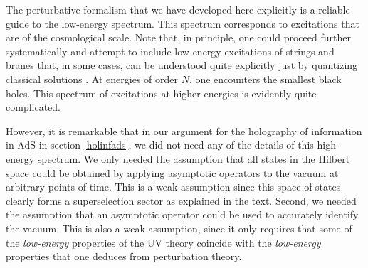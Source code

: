 \documentclass[12pt]{article}
\begin{document}
The perturbative formalism that we have developed here explicitly is a reliable guide to the low-energy spectrum. This spectrum corresponds to excitations that are of the cosmological scale.  Note that, in principle, one could proceed further systematically and attempt to include low-energy excitations of strings and branes that, in some cases, can be understood quite explicitly just by quantizing classical solutions \cite{Grant:2005qc,Mandal:2005wv,Maldacena:2000hw,mandal2008sgg,Ashok:2008fa}. At energies of order $N$, one encounters the smallest black holes.  This spectrum of excitations at higher energies is  evidently quite complicated.

However, it is remarkable that in our argument for the holography of information in AdS in section \ref{holinfads}, we did not need any of the details of this high-energy spectrum. We only needed the assumption that all states in the Hilbert space could be obtained by applying asymptotic operators to the vacuum at arbitrary points of time. This is a weak assumption since this space of states clearly forms a superselection sector as explained in the text. Second, we needed the assumption that an asymptotic operator  could be used to accurately identify the vacuum. This is also a weak assumption, since it only requires that some of the {\em low-energy} properties of the UV theory coincide with the {\em low-energy} properties that one deduces from perturbation theory.



\end{document}
